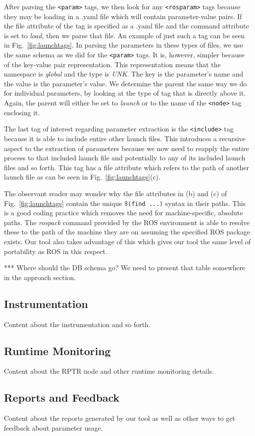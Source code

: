 After parsing the \texttt{<param>} tags, we then look for any \texttt{<rosparam>} tags because they may be loading in a .yaml file which will contain parameter-value pairs. If the file attribute of the tag is specified as a .yaml file and the command attribute is set to \emph{load}, then we parse that file. An example of just such a tag can be seen in Fig.~\ref{fig:launchtags}. In parsing the parameters in these types of files, we use the same schema as we did for the \texttt{<param>} tags. It is, however, simpler because of the key-value pair representation. This representation means that the namespace is \emph{global} and the type is \emph{UNK}. The key is the parameter's name and the value is the parameter's value. We determine the parent the same way we do for individual parameters, by looking at the type of tag that is directly above it. Again, the parent will either be set to \emph{launch} or to the name of the \texttt{<node>} tag enclosing it.

The last tag of interest regarding parameter extraction is the \texttt{<include>} tag because it is able to include entire other launch files. This introduces a recursive aspect to the extraction of parameters because we now need to reapply the entire process to that included launch file and potentially to any of its included launch files and so forth. This tag has a file attribute which refers to the path of another launch file as can be seen in Fig.~\ref{fig:launchtags}(c).

The observant reader may wonder why the file attributes in (b) and (c) of Fig.~\ref{fig:launchtags} contain the unique \texttt{$\$$(find ...)} syntax in their paths. This is a good coding practice which removes the need for machine-specific, absolute paths. The \emph{rospack} command provided by the ROS environment is able to resolve these to the path of the machine they are on assuming the specified ROS package exists. Our tool also takes advantage of this which gives our tool the same level of portability as ROS in this respect.

*** Where should the DB schema go? We need to present that table somewhere in the approach section.


\subsection{Instrumentation}

Content about the instrumentation and so forth.


\subsection{Runtime Monitoring}

Content about the RPTR node and other runtime monitoring details.


\subsection{Reports and Feedback}

Content about the reports generated by our tool as well as other ways to get feedback about parameter usage.

